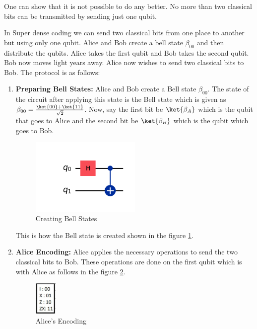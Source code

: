 \documentclass[12pt, oneside]{book}
\theoremstyle{definition}
\theoremstyle{definition}
\theoremstyle{remark}
\begin{document}
One can show that it is not possible to do any better. No more than two classical bits can be transmitted by sending just one qubit.

In Super dense coding we can send two classical bits from one place to another but using only one qubit. 
Alice and Bob create a bell state $\beta_{00}$ and then distribute the qubits. Alice takes the first qubit and Bob takes the second qubit.
Bob now moves light years away. Alice now wishes to send two classical bits to Bob. The protocol is as follows:
\begin{enumerate}
    \item \textbf{Preparing Bell States: }Alice and Bob create a Bell state $\beta_{00}$.
    The state of the circuit after applying this state is the Bell state which is given as $\beta_{00}=\frac{\ket{00}+\ket{11}}{\sqrt{2}}$.
    Now, say the first bit be $\ket{\beta_A}$ which is the qubit that goes to Alice and the second bit be $\ket{\beta_B}$ which is the qubit which goes to Bob.
    \begin{figure}[H]
        \centering
        \includegraphics[width=0.5\textwidth]{../images/superdense-coding1.png}
        \caption{Creating Bell States}
        \label{fig:superdense1}
    \end{figure}
    This is how the Bell state is created shown in the figure \ref{fig:superdense1}.
    \item \textbf{Alice Encoding: } Alice applies the necessary operations to send the two classical bits to Bob.
    These operations are done on the first qubit which is with Alice as follows in the figure \ref{fig:superdense2}.
    \begin{figure}[H]
        \centering
        \includegraphics[width=0.1\textwidth]{../images/superdense-coding2.png}
        \caption{Alice's Encoding}
        \label{fig:superdense2}

\end{figure}
\end{enumerate}
\end{document}
